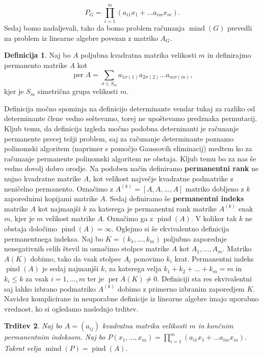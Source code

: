 \documentclass[12pt,a4paper,twoside]{article}
\theoremstyle{definition} %
\newtheorem{definicija}{Definicija}[section]
\theoremstyle{plain} %
\newtheorem{trditev}[definicija]{Trditev}
\numberwithin{equation}{section}  %
\DeclareMathOperator{\per}{per}
\DeclareMathOperator{\mind}{mind}
\DeclareMathOperator{\pind}{pind}
\begin{document}
$$P_G = \prod_{i=1}^m (a_{i1}x_1 + \ldots a_{im}x_m).$$
Sedaj bomo nadaljevali, tako da bomo problem računanja $\mind(G)$ prevedli na problem iz linearne algebre povezan z matriko $A_G$. 
 \begin{definicija}
Naj bo $A$ poljubna kvadratna matrika velikosti $m$ in definirajmo permanento matrike $A$ kot 
$$ \per A = \sum_{\sigma \in S_m} a_{1\sigma(1)} a_{2\sigma(2)} \ldots a_{m\sigma(m)} ,$$
kjer je $S_m$ simetrična grupa velikosti $m$.
\end{definicija}
Definicija močno spominja na definicijo determinante vendar tukaj za razliko od determinante člene vedno seštevamo, torej ne upoštevamo predznaka permutacij. Kljub temu, da definicija izgleda močno podobna deterninanti je računanje permanente precej težji problem, saj za računanje determinante poznamo polinomski algoritem (naprimer s pomočjo Gaussovih eliminacij) medtem ko za računanje permanente polinomski algoritem ne obstaja. Kljub temu bo za nas še vedno dovolj dobro orodje. Na podoben način definiramo \textbf{permanentni rank} ne nujno kvadratne matrike $A$, kot velikost največje kvadratne podmatrike z neničelno permanento. Označimo  z $A^{(k)} = [A,A, \ldots, A]$ matriko dobljeno z $k$ zaporednimi kopijami matrike $A$. Sedaj definiramo še \textbf{permanentni indeks} matrike $A$ kot najmanjši $k$ za katerega je permanentni rank matrike $A^{(k)}$ enak $m$, kjer je $m$ velikost matrike $A$. Označimo  ga z $\pind(A)$. V kolikor tak $k$ ne obstaja določimo $\pind(A) = \infty$. Oglejmo si še ekvivalentno definicija permanentnega indeksa. Naj bo $K = (k_1, \ldots, k_m)$ poljubno zaporednje nenegativnih celih števil in označimo stolpce matrike $A$ kot $A_1, \ldots, A_m$. Matriko $A(K)$ dobimo, tako da vsak stolpec $A_i$ ponovimo $k_i$ krat. Permanentni indeks $\pind(A)$ je sedaj najmanjši $k$, za katerega velja $k_1 + k_2 + \ldots + k_m = m$ in $k_i \le k$ za vsak $i = 1, \ldots, m$ ter je $\per A(K) \neq 0$. Definiciji sta res ekvivalentni saj lahko izbrano podmatriko $A^{(k)}$ dobimo z primerno izbranim zaporedjem $K$. Navidez komplicirane in neuporabne definicije iz linearne algebre imajo uporabno vrednost, ko si ogledamo naslednjo trditev.

\begin{trditev}
\label{mpind}
Naj bo $A = (a_{ij})$ kvadratna matrika velikosti $m$ in končnim permanentnim indeksom. Naj bo $P(x_1, \ldots, x_m) = \prod_{i=1}^m (a_{i1}x_1 + \ldots a_{im}x_m)$. Takrat velja $\mind(P) = \pind(A)$.
\end{trditev}
\end{document}
